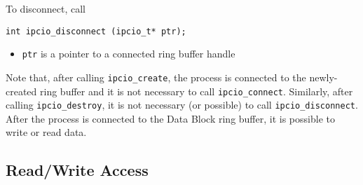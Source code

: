 To disconnect, call
\begin{verbatim}
int ipcio_disconnect (ipcio_t* ptr);
\end{verbatim}
\vspace{-3mm}
\begin{itemize}
\item {\tt ptr} is a pointer to a connected ring buffer handle
\end{itemize}
Note that, after calling {\tt ipcio\_create}, the process is connected
to the newly-created ring buffer and it is not necessary to call 
{\tt ipcio\_connect}.  Similarly, after calling {\tt ipcio\_destroy},
it is not necessary (or possible) to call {\tt ipcio\_disconnect}.
After the process is connected to the Data Block ring buffer, it is
possible to write or read data.

\subsection{Read/Write Access}

